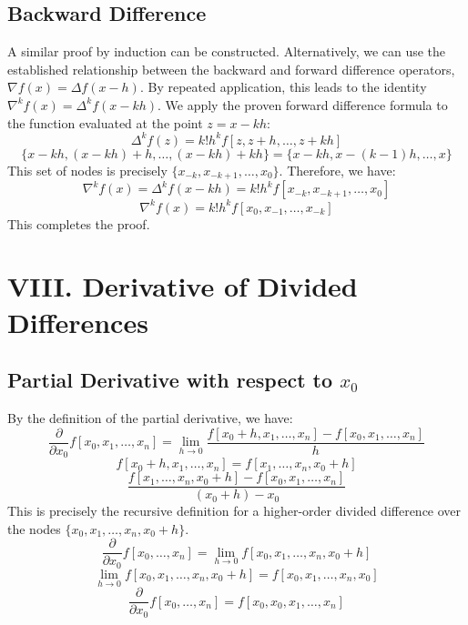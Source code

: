 \documentclass[a4paper]{article}
\begin{document}
\subsection*{Backward Difference}

A similar proof by induction can be constructed. Alternatively, we can use the established relationship between the backward and forward difference operators, $\nabla f(x) = \Delta f(x-h)$.
By repeated application, this leads to the identity $\nabla^k f(x) = \Delta^k f(x-kh)$.
We apply the proven forward difference formula to the function evaluated at the point $z = x-kh$:
\[
\Delta^k f(z) = k!h^k f[z, z+h, \dots, z+kh]
\]
\[
\{x-kh, (x-kh)+h, \dots, (x-kh)+kh\} = \{x-kh, x-(k-1)h, \dots, x\}
\]
This set of nodes is precisely $\{x_{-k}, x_{-k+1}, \dots, x_0\}$.
Therefore, we have:
\[
\nabla^k f(x) = \Delta^k f(x-kh) = k!h^k f[x_{-k}, x_{-k+1}, \dots, x_0]
\]
\[
\nabla^k f(x) = k!h^k f[x_0, x_{-1}, \dots, x_{-k}]
\]
This completes the proof.



\section*{VIII. Derivative of Divided Differences}

\subsection*{Partial Derivative with respect to $x_0$}

By the definition of the partial derivative, we have:
\[
\frac{\partial}{\partial x_0} f[x_0, x_1, \dots, x_n] = \lim_{h \to 0} \frac{f[x_0+h, x_1, \dots, x_n] - f[x_0, x_1, \dots, x_n]}{h}
\]
\[
f[x_0+h, x_1, \dots, x_n] = f[x_1, \dots, x_n, x_0+h]
\]
\[
\frac{f[x_1, \dots, x_n, x_0+h] - f[x_0, x_1, \dots, x_n]}{(x_0+h) - x_0}
\]
This is precisely the recursive definition for a higher-order divided difference over the nodes $\{x_0, x_1, \dots, x_n, x_0+h\}$.
\[
\frac{\partial}{\partial x_0} f[x_0, \dots, x_n] = \lim_{h \to 0} f[x_0, x_1, \dots, x_n, x_0+h]
\]
\[
\lim_{h \to 0} f[x_0, x_1, \dots, x_n, x_0+h] = f[x_0, x_1, \dots, x_n, x_0]
\]
\[
\frac{\partial}{\partial x_0} f[x_0, \dots, x_n] = f[x_0, x_0, x_1, \dots, x_n]
\]
\end{document}
